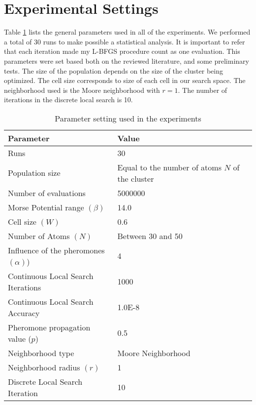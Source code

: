 \section{Experimental Settings}
\label{sec:experimental_setting}

Table \ref{tab:general_settings} lists the general parameters used in all of the experiments. We performed a total of 30 runs to make possible a statistical analysis. It is important to refer that each iteration made my L-BFGS procedure count as one evaluation. This parameters were set based both on the reviewed literature, and some preliminary tests. The size of the population depends on the size of the cluster being optimized. 
The cell size corresponds to size of each cell in our search space. The neighborhood used is the Moore neighborhood with $r = 1$. The number of iterations in the discrete local search is 10.

\begin{table}[!htbp]
	\begin{center}
		\begin{tabular}{| l | p{8cm} |}
			\hline
			\textbf{Parameter} & \textbf{Value} \\ \hline
			Runs & 30 \\
			Population size & Equal to the number of atoms $N$ of the cluster \\
			Number of evaluations & 5000000 \\
			Morse Potential range $(\beta)$ & 14.0 \\ 
			Cell size $(W)$ & 0.6 \\
			Number of Atoms $(N)$ & Between 30 and 50 \\
			Influence of the pheromones $(\alpha)$) & 4 \\
			Continuous Local Search Iterations & 1000\\
			Continuous Local Search Accuracy & 1.0E-8\\
			Pheromone propagation value ($p$) & 0.5 \\
			Neighborhood type & Moore Neighborhood \\
			Neighborhood radius $(r)$ & 1 \\
			Discrete Local Search Iteration & 10 \\
			\hline
		\end{tabular}
	\caption{Parameter setting used in the experiments}
	\label{tab:general_settings}
	\end{center}
\end{table}


